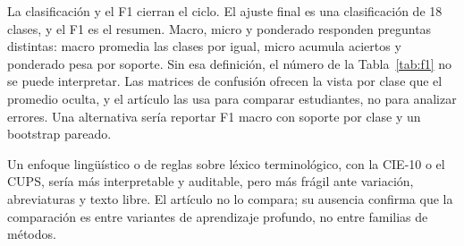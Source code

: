 La clasificación y el F1 cierran el ciclo. El ajuste final es una clasificación de 18 clases, y el F1 es el resumen. Macro, micro y ponderado responden preguntas distintas: macro promedia las clases por igual, micro acumula aciertos y ponderado pesa por soporte. Sin esa definición, el número de la Tabla~\ref{tab:f1} no se puede interpretar. Las matrices de confusión ofrecen la vista por clase que el promedio oculta, y el artículo las usa para comparar estudiantes, no para analizar errores. Una alternativa sería reportar F1 macro con soporte por clase y un bootstrap pareado.

Un enfoque lingüístico o de reglas sobre léxico terminológico, con la CIE-10 o el CUPS, sería más interpretable y auditable, pero más frágil ante variación, abreviaturas y texto libre. El artículo no lo compara; su ausencia confirma que la comparación es entre variantes de aprendizaje profundo, no entre familias de métodos.

